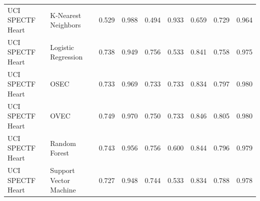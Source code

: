 \begin{tabular}{llrrrrrrr}
UCI SPECTF Heart & K-Nearest Neighbors & 0.529 & 0.988 & 0.494 & 0.933 & 0.659 & 0.729 & 0.964 \\
UCI SPECTF Heart & Logistic Regression & 0.738 & 0.949 & 0.756 & 0.533 & 0.841 & 0.758 & 0.975 \\
UCI SPECTF Heart & OSEC & 0.733 & 0.969 & 0.733 & 0.733 & 0.834 & 0.797 & 0.980 \\
UCI SPECTF Heart & OVEC & 0.749 & 0.970 & 0.750 & 0.733 & 0.846 & 0.805 & 0.980 \\
UCI SPECTF Heart & Random Forest & 0.743 & 0.956 & 0.756 & 0.600 & 0.844 & 0.796 & 0.979 \\
UCI SPECTF Heart & Support Vector Machine & 0.727 & 0.948 & 0.744 & 0.533 & 0.834 & 0.788 & 0.978 \\
\bottomrule
\end{tabular}
